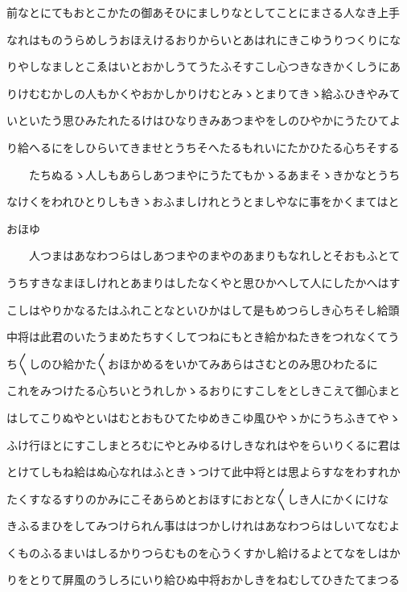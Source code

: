 \documentclass[a4paper,11pt,landscape]{ltjtarticle}
\begin{document}
\par\medskip
前なとにてもおとこかたの御あそひにましりなとしてことにまさる人なき上手
\par\medskip
なれはものうらめしうおほえけるおりからいとあはれにきこゆうりつくりにな
\par\medskip
りやしなましとこゑはいとおかしうてうたふそすこし心つきなきかくしうにあ
\par\medskip
りけむむかしの人もかくやおかしかりけむとみゝとまりてきゝ給ふひきやみて
\par\medskip
いといたう思ひみたれたるけはひなりきみあつまやをしのひやかにうたひてよ
\par\medskip
り給へるにをしひらいてきませとうちそへたるもれいにたかひたる心ちそする
\par\medskip
　　たちぬるゝ人しもあらしあつまやにうたてもかゝるあまそゝきかなとうち
\par\medskip
なけくをわれひとりしもきゝおふましけれとうとましやなに事をかくまてはと
\par\medskip
おほゆ
\par\medskip
　　人つまはあなわつらはしあつまやのまやのあまりもなれしとそおもふとて
\par\medskip
うちすきなまほしけれとあまりはしたなくやと思ひかへして人にしたかへはす
\par\medskip
こしはやりかなるたはふれことなといひかはして是もめつらしき心ちそし給頭
\par\medskip
中将は此君のいたうまめたちすくしてつねにもとき給かねたきをつれなくてう
\par\medskip
ち〱しのひ給かた〱おほかめるをいかてみあらはさむとのみ思ひわたるに
\par\medskip
これをみつけたる心ちいとうれしかゝるおりにすこしをとしきこえて御心まと
\par\medskip
はしてこりぬやといはむとおもひてたゆめきこゆ風ひやゝかにうちふきてやゝ
\par\medskip
ふけ行ほとにすこしまとろむにやとみゆるけしきなれはやをらいりくるに君は
\par\medskip
とけてしもね給はぬ心なれはふときゝつけて此中将とは思よらすなをわすれか
\par\medskip
たくすなるすりのかみにこそあらめとおほすにおとな〱しき人にかくにけな
\par\medskip
きふるまひをしてみつけられん事ははつかしけれはあなわつらはしいてなむよ
\par\medskip
くものふるまいはしるかりつらむものを心うくすかし給けるよとてなをしはか
\par\medskip
りをとりて屏風のうしろにいり給ひぬ中将おかしきをねむしてひきたてまつる
\end{document}
